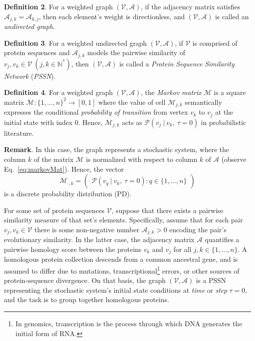 \textbf{Definition 2}. For a weighted graph \((\mathscr{V}, \mathcal{A})\), if the adjacency matrix satisfies \(\mathcal{A}_{j, k} = \mathcal{A}_{k, j}\), then each element's weight is directionless, and \((\mathscr{V}, \mathcal{A})\) is called an \textit{undirected graph}.

\textbf{Definition 3}. For a weighted undirected graph \((\mathscr{V}, \mathcal{A})\), if \(\mathscr{V}\) is comprised of protein sequences and \(\mathcal{A}_{j,k}\) models the pairwise similarity of \(v_j, v_k \in \mathscr{V} \ ( j,k \in \mathbb{N}^* )\), then \((\mathscr{V}, \mathcal{A})\) is called a \textit{Protein Sequence Similarity Network} (\textit{PSSN}).

\textbf{Definition 4}. For a weighted graph \((\mathscr{V}, \mathcal{A})\), the \textit{Markov matrix} \(\mathcal{M}\) is a square matrix \(\mathcal{M}: \{ 1, \dots, n \}^2 \rightarrow [0, 1]\) where the value of cell \(\mathcal{M}_{j, k}\) semantically expresses the conditional \textit{probability of transition} from vertex \(v_k\) to \(v_j\) at the initial state with index $0$. Hence, \(\mathcal{M}_{j,k}\) acts as \(\mathcal{P}(v_j \ | \ v_k, \ \tau=0)\) in probabilistic literature.

\textbf{Remark}. In this case, the graph represents a stochastic system, where the column \(k\) of the matrix \(\mathcal{M}\) is normalized with respect to column \(k\) of \(\mathcal{A}\) (observe Eq.~\ref{eq:markovMat}). Hence, the vector
\[
  \mathcal{M}_{\cdot, k} =
  \begin{pmatrix}
    \mathcal{P}(v_q \ | \ v_k, \ \tau=0) : q \in \{ 1, \dots, n \}
  \end{pmatrix}
\]
is a discrete probability distribution (PD).

For some set of protein sequences \(\mathscr{V}\), suppose that there exists a
pairwise similarity measure of that set's elements. Specifically, assume that
for each pair \(v_j, v_k \in \mathscr{V}\) there is some non-negative number
\(\mathcal{A}_{j,k} > 0\) encoding the pair's evolutionary similarity.
In the latter case, the adjacency
matrix \(\mathcal{A}\) quantifies a pairwise homology score between the
proteins \(v_k\) and \(v_j\) for all \(j, k \in \{ 1, \dots, n \}\). A
homologous protein collection descends from a common ancestral gene, and is
assumed to differ due to mutations, transcriptional\footnote{In genomics,
transcription is the process through which DNA generates the initial form of
RNA.} errors, or other sources of protein-sequence divergence.  On that basis,
the graph \((\mathscr{V}, \mathcal{A})\) is a PSSN representing the stochastic
system's initial state conditions at \textit{time} or \textit{step} \(\tau =
0\), and the task is to group together homologous proteins.


